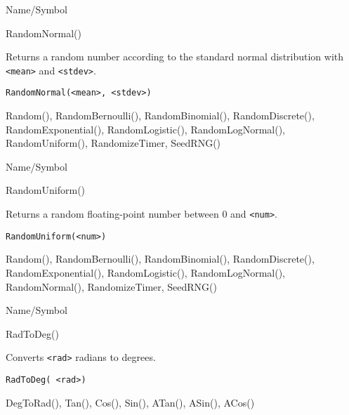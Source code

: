 \rl


\begin{desc}{Name/Symbol}
\item[Name/Symbol] 	RandomNormal()

\item[Description] 	Returns a random number according to the standard
             	normal distribution with \verb+<mean>+ and \verb+<stdev>+.

\item[Usage]       	
\begin{verbatim}
RandomNormal(<mean>, <stdev>)
\end{verbatim}

\item[Example]	

\item[See Also]	Random(), RandomBernoulli(), RandomBinomial(),
		RandomDiscrete(), RandomExponential(), RandomLogistic(), 
		RandomLogNormal(), RandomUniform(), RandomizeTimer, SeedRNG()
\end{desc}

\rl


\begin{desc}{Name/Symbol}
\item[Name/Symbol]	RandomUniform()

\item[Description]	Returns a random floating-point number between 0 and \verb+<num>+.

\item[Usage]		
\begin{verbatim}
RandomUniform(<num>)
\end{verbatim}

\item[Example]	

\item[See Also]    	Random(), RandomBernoulli(), RandomBinomial(), 
			RandomDiscrete(), RandomExponential(), RandomLogistic(), 
			RandomLogNormal(), RandomNormal(), RandomizeTimer, SeedRNG()
\end{desc}

\rl


\begin{desc}{Name/Symbol}
\item[Name/Symbol] 	RadToDeg() 

\item[Description] 	Converts \verb+<rad>+ radians to degrees.

\item[Usage]		
\begin{verbatim}
RadToDeg( <rad>)			 
\end{verbatim}

\item[Example]	

\item[See Also]     	DegToRad(), Tan(), Cos(), Sin(), ATan(), ASin(), ACos()
\end{desc}

